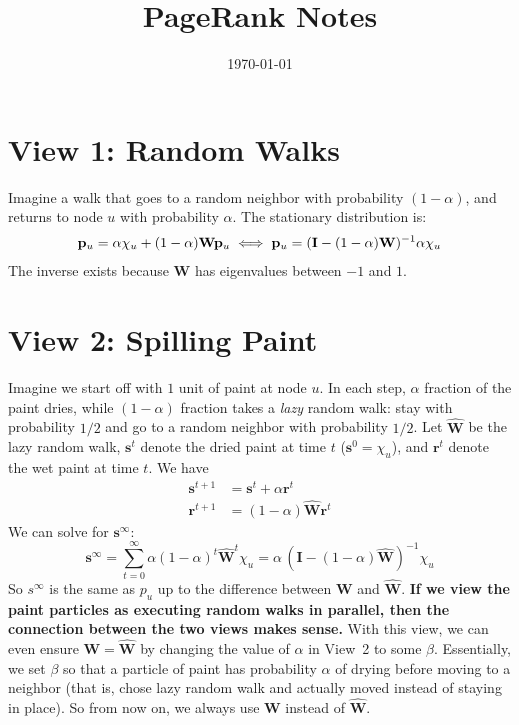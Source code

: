 \documentclass{article}
\newcommand{\bW}{\mathbf{W}}
\newcommand{\wW}{\widehat{\mathbf{W}}}
\newcommand{\bp}{\mathbf{p}}
\newcommand{\bs}{\mathbf{s}}
\newcommand{\br}{\mathbf{r}}
\newcommand{\I}{\mathbf{I}}
\newcommand{\0}{\mathbf{0}}
\begin{document}
\title{PageRank Notes}
\date{\today}
\maketitle

\section{View 1: Random Walks}

Imagine a walk that goes to a random neighbor with probability $(1-\alpha)$, and returns to node $u$ with probability $\alpha$. The stationary distribution is:
\begin{gather}
\bp_u = \alpha \chi_u + (1-\alpha) \bW \bp_u \iff \bp_u = (\I - (1-\alpha)\bW)^{-1} \alpha \chi_u \label1
\end{gather}
The inverse exists because $\bW$ has eigenvalues between $-1$ and $1$.

\section{View 2: Spilling Paint}

Imagine we start off with $1$ unit of paint at node $u$. In each step, $\alpha$ fraction of the paint dries, while $(1-\alpha)$ fraction takes a \emph{lazy} random walk: stay with probability $1/2$ and go to a random neighbor with probability $1/2$. Let $\wW$ be the lazy random walk, $\bs^t$ denote the dried paint at time $t$ ($\bs^0=\chi_u$), and $\br^t$ denote the wet paint at time $t$. We have
\begin{align*}
\bs^{t+1} &= \bs^t + \alpha \br^t \\
\br^{t+1} &= (1-\alpha) \wW \br^t
\end{align*}
We can solve for $\bs^\infty$:
\[ \bs^\infty = \sum_{t=0}^\infty \alpha (1-\alpha)^t \wW^t \chi_u = \alpha \, (\I - (1-\alpha)\wW)^{-1} \chi_u \]
So $s^\infty$ is the same as $p_u$ up to the difference between $\bW$ and $\wW$. 
\textbf{If we view the paint particles as executing random walks in parallel, then the connection between the two views makes sense.} With this view, we can even ensure $\bW=\wW$ by changing the value of $\alpha$ in View~2 to some $\beta$. Essentially, we set $\beta$ so that a particle of paint has probability $\alpha$ of drying before moving to a neighbor (that is, chose lazy random walk and actually moved instead of staying in place). So from now on, we always use $\bW$ instead of $\wW$.
\end{document}
